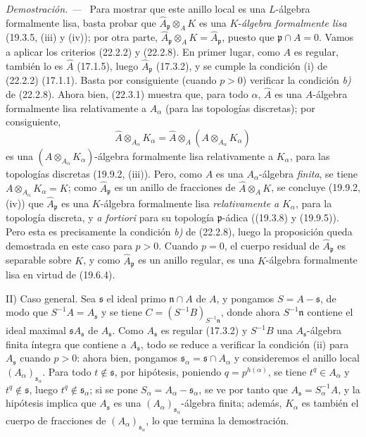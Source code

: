 \documentclass[10pt,oneside]{book}
\newenvironment{proof}{%
  \par\medskip\noindent\textit{Demostración. ---\ }}{\par}
\providecommand{\setmin}{-}%
\begin{document}
\begin{proof}
Para mostrar que este anillo local es una $L$-álgebra formalmente lisa, basta
probar que $\widehat A_\mathfrak p\otimes_A K$ es una $K$-\emph{álgebra formalmente
lisa} (19.3.5, (iii) y (iv)); por otra parte,
$\widehat A_\mathfrak p\otimes_A K=\widehat A_\mathfrak p$, puesto que
$\mathfrak p\cap A=0$. Vamos a aplicar los criterios (22.2.2) y (22.2.8).
En primer lugar, como $A$ es regular, también lo es $\widehat A$ (17.1.5),
luego $\widehat A_\mathfrak p$ (17.3.2), y se cumple la condición (i) de
(22.2.2) (17.1.1). Basta por consiguiente (cuando $p>0$) verificar la
condición \emph{b)} de (22.2.8). Ahora bien, (22.3.1) muestra que, para todo
$\alpha$, $\widehat A$ es una $A$-álgebra formalmente lisa relativamente a
$A_\alpha$ (para las topologías discretas); por consiguiente,
\[
  \widehat A\otimes_{A_\alpha}K_\alpha
  =\widehat A\otimes_A(A\otimes_{A_\alpha}K_\alpha)
\]
es una $(A\otimes_{A_\alpha}K_\alpha)$-álgebra formalmente lisa relativamente
a $K_\alpha$, para las topologías discretas (19.9.2, (iii)). Pero, como $A$
es una $A_\alpha$-álgebra \emph{finita}, se tiene
$A\otimes_{A_\alpha}K_\alpha=K$; como $\widehat A_\mathfrak p$ es un anillo
de fracciones de $\widehat A\otimes_A K$, se concluye (19.9.2, (iv)) que
$\widehat A_\mathfrak p$ es una $K$-álgebra formalmente lisa \emph{relativamente a}
$K_\alpha$, para la topología discreta, y \emph{a fortiori} para su topología
$\mathfrak p$-ádica ((19.3.8) y (19.9.5)). Pero esta es precisamente la
condición \emph{b)} de (22.2.8), luego la proposición queda demostrada en este caso
para $p>0$. Cuando $p=0$, el cuerpo residual de
$\widehat A_\mathfrak p$ es separable sobre $K$, y como
$\widehat A_\mathfrak p$ es un anillo regular, es una $K$-álgebra formalmente
lisa en virtud de (19.6.4).

II) Caso general. Sea $\mathfrak s$ el ideal primo $\mathfrak n\cap A$ de
$A$, y pongamos $S=A\setmin\mathfrak s$, de modo que $S^{-1}A=A_\mathfrak s$ y se
tiene $C=(S^{-1}B)_{S^{-1}\mathfrak n}$, donde ahora
$S^{-1}\mathfrak n$ contiene el ideal maximal
$\mathfrak sA_\mathfrak s$ de $A_\mathfrak s$. Como $A_\mathfrak s$ es
regular (17.3.2) y $S^{-1}B$ una $A_\mathfrak s$-álgebra finita íntegra que
contiene a $A_\mathfrak s$, todo se reduce a verificar la condición (ii) para
$A_\mathfrak s$ cuando $p>0$: ahora bien, pongamos
$\mathfrak s_\alpha=\mathfrak s\cap A_\alpha$ y consideremos el anillo local
$(A_\alpha)_{\mathfrak s_\alpha}$. Para todo $t\notin\mathfrak s$, por
hipótesis, poniendo $q=p^{h(\alpha)}$, se tiene $t^q\in A_\alpha$ y
$t^q\notin\mathfrak s$, luego $t^q\notin\mathfrak s_\alpha$; si se pone
$S_\alpha=A_\alpha\setmin\mathfrak s_\alpha$, se ve por tanto que
$A_\mathfrak s=S_\alpha^{-1}A$, y la hipótesis implica que
$A_\mathfrak s$ es una $(A_\alpha)_{\mathfrak s_\alpha}$-álgebra finita;
además, $K_\alpha$ es también el cuerpo de fracciones de
$(A_\alpha)_{\mathfrak s_\alpha}$, lo que termina la demostración.
\end{proof}
\end{document}
